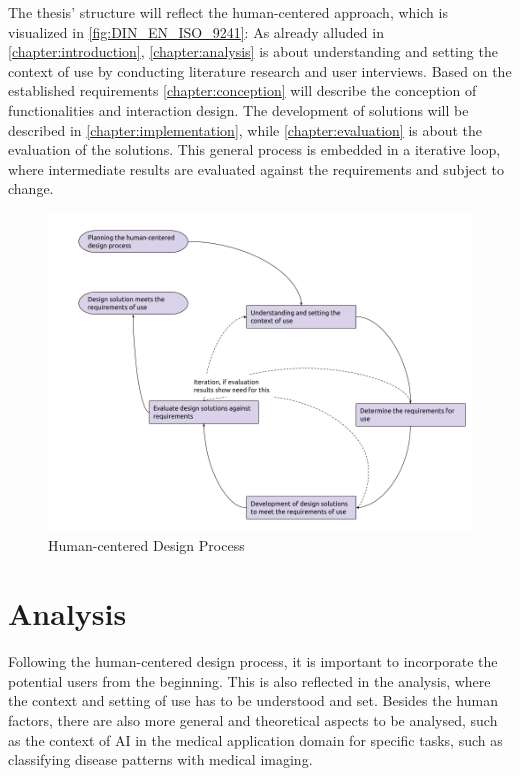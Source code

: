 \documentclass[11pt,a4paper,english]{scrreprt}
\begin{document}
The thesis' structure will reflect the human-centered approach, which is visualized in \autoref{fig:DIN_EN_ISO_9241}: As already alluded in \autoref{chapter:introduction}, \autoref{chapter:analysis} is about understanding and setting the context of use by conducting literature research and user interviews. Based on the established requirements \autoref{chapter:conception} will describe the conception of functionalities and interaction design. The development of solutions will be described in \autoref{chapter:implementation}, while \autoref{chapter:evaluation} is about the evaluation of the solutions. This general process is embedded in a iterative loop, where intermediate results are evaluated against the requirements and subject to change.
\begin{figure}[htbp]
    \centering
    \includegraphics[width=\textwidth]{img/figures/DIN_EN_ISO_9241-210.png}
    \caption{Human-centered Design Process \parencite{DIN}}
    \label{fig:DIN_EN_ISO_9241}
\end{figure}

\newpage
\chapter{Analysis}\label{chapter:analysis}
Following the human-centered design process, it is important to incorporate the potential users from the beginning. This is also reflected in the analysis, where the context and setting of use has to be understood and set. Besides the human factors, there are also more general and theoretical aspects to be analysed, such as the context of AI in the medical application domain for specific tasks, such as classifying disease patterns with medical imaging.
\end{document}
